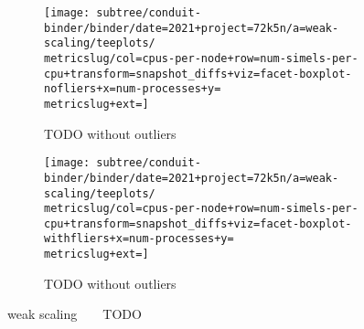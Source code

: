 \begin{figure*}
  \centering
  \begin{subfigure}[b]{0.5\textwidth}
    \centering
    \texttt{[image: subtree/conduit-binder/binder/date=2021+project=72k5n/a=weak-scaling/teeplots/\\metricslug/col=cpus-per-node+row=num-simels-per-cpu+transform=snapshot\_diffs+viz=facet-boxplot-nofliers+x=num-processes+y=\\metricslug+ext=]}
    \caption{TODO without outliers}
    \label{fig:weak-scaling-distribution-\metricslug-nofliers}
  \end{subfigure}%
  \begin{subfigure}[b]{0.5\textwidth}
    \centering
    \texttt{[image: subtree/conduit-binder/binder/date=2021+project=72k5n/a=weak-scaling/teeplots/\\metricslug/col=cpus-per-node+row=num-simels-per-cpu+transform=snapshot\_diffs+viz=facet-boxplot-withfliers+x=num-processes+y=\\metricslug+ext=]}
    \caption{TODO without outliers}
    \label{fig:weak-scaling-distribution-\metricslug-withfliers}
  \end{subfigure}
  \caption{weak scaling ~ \metric ~ TODO}
  \label{fig:weak-scaling-distribution-\metricslug}
\end{figure*}
